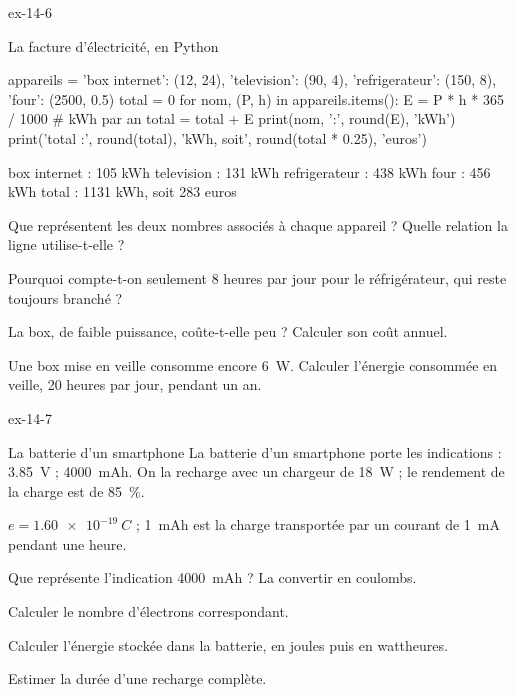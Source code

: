 \begin{blocLivre}{ex-14-6}
\begin{exercice}[2]{La facture d'électricité, en Python}
\begin{python}
appareils = {'box internet': (12, 24), 'television': (90, 4),
             'refrigerateur': (150, 8), 'four': (2500, 0.5)}
total = 0
for nom, (P, h) in appareils.items():
    E = P * h * 365 / 1000            # kWh par an
    total = total + E
    print(nom, ':', round(E), 'kWh')
print('total :', round(total), 'kWh, soit', round(total * 0.25), 'euros')
\end{python}
\begin{console}
box internet : 105 kWh
television : 131 kWh
refrigerateur : 438 kWh
four : 456 kWh
total : 1131 kWh, soit 283 euros
\end{console}
\begin{questions}
\item {}Que représentent les deux nombres associés à chaque appareil ? Quelle relation la ligne  utilise-t-elle ?
\item Pourquoi compte-t-on seulement 8 heures par jour pour le réfrigérateur, qui reste toujours branché ?
\item La box, de faible puissance, coûte-t-elle peu ? Calculer son coût annuel.
\item Une box mise en veille consomme encore \qty{6}{W}. Calculer l'énergie consommée en veille, 20 heures par jour, pendant un an.
\end{questions}
\end{exercice}
\end{blocLivre}
\begin{blocLivre}{ex-14-7}
\begin{exercice}[2]{La batterie d'un smartphone}
La batterie d'un smartphone porte les indications : \qty{3,85}{V} ; \qty{4000}{mAh}. On la recharge avec un chargeur de \qty{18}{W} ; le rendement
de la charge est de \qty{85}{\percent}.
\begin{donnees}
$e=\qty{1,60e-19}{C}$ ; \qty{1}{mAh} est la charge transportée par un courant de \qty{1}{mA} pendant une heure.
\end{donnees}
\begin{questions}
\item Que représente l'indication \qty{4000}{mAh} ? La convertir en coulombs.
\item Calculer le nombre d'électrons correspondant.
\item Calculer l'énergie stockée dans la batterie, en joules puis en wattheures.
\item Estimer la durée d'une recharge complète.
\end{questions}
\end{exercice}
\end{blocLivre}
